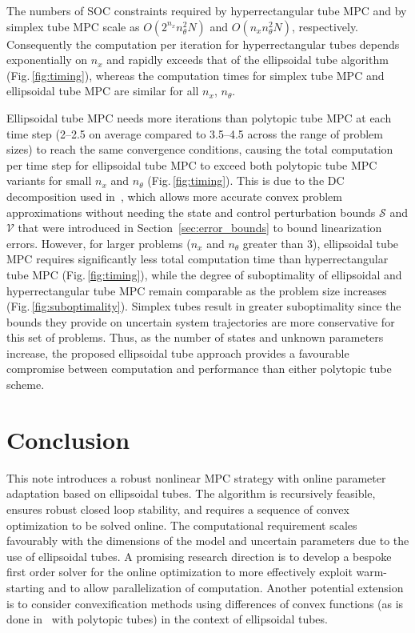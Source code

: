 \documentclass{IEEEtran}
\theoremstyle{definition}
\theoremstyle{remark}
\begin{document}
The numbers of SOC constraints required by hyperrectangular tube MPC and by simplex tube MPC scale as 
$O(2^{n_x}n_\theta^2N)$ 
and
$O(n_xn_\theta^2N)$,
respectively.
Consequently the computation per iteration for hyperrectangular tubes depends exponentially on $n_x$ and rapidly exceeds that of the ellipsoidal tube algorithm (Fig.\,\ref{fig:timing}), whereas the computation times for simplex tube MPC and ellipsoidal tube MPC are similar for all $n_x$, $n_\theta$.

Ellipsoidal tube MPC needs more iterations than polytopic tube MPC at each time step (2--2.5 on average compared to 3.5--4.5 across the range of problem sizes) to reach the same convergence conditions, causing the total computation per time step for ellipsoidal tube MPC to exceed both polytopic tube MPC variants for small $n_x$ and $n_\theta$ (Fig.\,\ref{fig:timing}).
%
This is due to the DC decomposition used in~\cite{Bue24}, which allows more accurate convex problem approximations without needing the state and control perturbation bounds $\mathcal{S}$ and $\mathcal{V}$ that were introduced in Section~\ref{sec:error_bounds} to bound linearization errors. 
%
However, for larger problems ($n_x$ and $n_\theta$ greater than $3$), ellipsoidal tube MPC requires significantly less total computation time than hyperrectangular tube MPC  (Fig.\,\ref{fig:timing}), while the degree of suboptimality of ellipsoidal and hyperrectangular tube MPC remain comparable as the problem size increases (Fig.\,\ref{fig:suboptimality}). Simplex tubes result in greater suboptimality since the bounds they provide on uncertain system trajectories are more conservative for  this set of problems. 
%
Thus, as the number of states and  unknown parameters increase, the proposed ellipsoidal tube approach provides a favourable compromise between computation and performance than either polytopic tube scheme.

\section{Conclusion}\label{sec:conclusion}
This note introduces a robust nonlinear MPC strategy with online parameter adaptation based on ellipsoidal tubes. The algorithm is recursively feasible, ensures robust closed loop stability, and requires a sequence of convex optimization to be solved online. The computational requirement scales favourably with the dimensions of the model and uncertain parameters due to the use of ellipsoidal tubes.
%
A promising research direction is to develop a bespoke first order solver for the online optimization to more effectively exploit warm-starting and to allow parallelization of computation. 
%
Another potential extension is to consider convexification methods using differences of convex functions (as is done in~\cite{Bue24} with polytopic tubes) in the context of ellipsoidal tubes.



\end{document}
